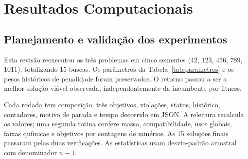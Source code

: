 \section{Resultados Computacionais}

\subsection{Planejamento e validação dos experimentos}

Esta revisão reexecutou os três problemas em cinco sementes ($42$, $123$, $456$, $789$, $1011$), totalizando 15 buscas. Os parâmetros da Tabela~\ref{tab:parametros} e os pesos históricos de penalidade foram preservados. O retorno passou a ser a melhor solução viável observada, independentemente da incumbente por fitness.

Cada rodada tem composição, três objetivos, violações, status, histórico, contadores, motivo de parada e tempo decorrido em JSON. A releitura recalcula os valores; uma segunda rotina confere massa, compatibilidade, usos globais, faixas químicas e objetivos por contagens de minérios. As 15 soluções finais passaram pelas duas verificações. As estatísticas usam desvio-padrão amostral com denominador $n-1$.


